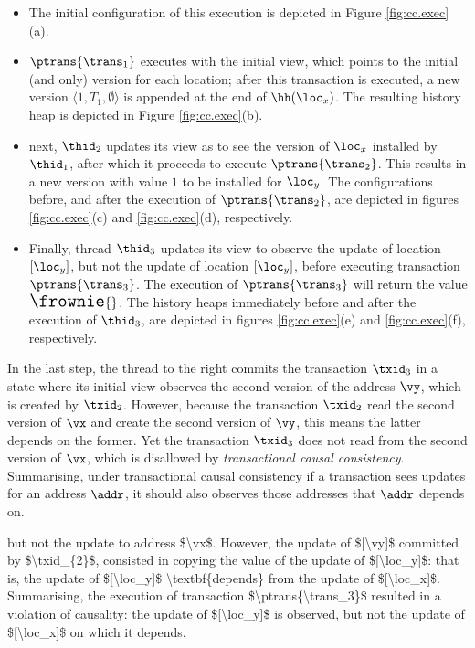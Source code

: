\begin{itemize}
\item The initial configuration of this execution is depicted in Figure \ref{fig:cc.exec}(a).
\item $\ptrans{\trans_1}$ executes with the initial view, which points to the 
initial (and only) version for each location; after this transaction is 
executed, a new version $\langle 1, T_1, \emptyset \rangle$ is appended 
at the end of $\hh(\loc_{x})$. The resulting history heap is depicted in Figure \ref{fig:cc.exec}(b).
\item next, $\thid_2$ updates its view as to see the version of $\loc_x$ installed by $\thid_1$, after 
which it proceeds to execute $\ptrans{\trans_2}$. This results in a new version with value $1$ 
to be installed for $\loc_y$. The configurations before, and after the execution of $\ptrans{\trans_2}$, 
are depicted in figures \ref{fig:cc.exec}(c) and \ref{fig:cc.exec}(d), respectively.
\item Finally, thread $\thid_3$ updates its view to observe the update of location $[\loc_y]$, but not the update of 
location $[\loc_y]$, before executing transaction $\ptrans{\trans_3}$. The execution of $\ptrans{\trans_3}$ will 
return the value ${\Large \frownie{}}$. The history heaps immediately before and after 
the execution of $\thid_3$, are depicted in figures \ref{fig:cc.exec}(e) and \ref{fig:cc.exec}(f), respectively. 
\end{itemize}


In the last step, the thread to the right commits the transaction $\txid_3$ in a state where its initial view observes the second version of the address $\vy$, which is created by \( \txid_{2} \).
However, because the transaction \( \txid_{2} \) read the second version of \( \vx \) and create the second version of \( \vy \), this means the latter depends on the former.
Yet the transaction \( \txid_{3} \) does not read from the second version of \( \vx \), which is disallowed by \emph{transactional causal consistency}.
Summarising, under transactional causal consistency if a transaction sees updates for an address \( \addr \), it should also observes those addresses that \( \addr \) depends on.

\ac{
but not the update to address $\vx$.
However, the update of $[\vy]$ committed by $\txid_{2}$, consisted in copying the value of the update 
of $[\loc_y]$: that is, the update of $[\loc_y]$ \textbf{depends} from the update of $[\loc_x]$. 
Summarising, the execution of transaction $\ptrans{\trans_3}$ resulted in a violation of 
causality: the update of $[\loc_y]$ is observed, but not the update of $[\loc_x]$ on which 
it depends.
}

